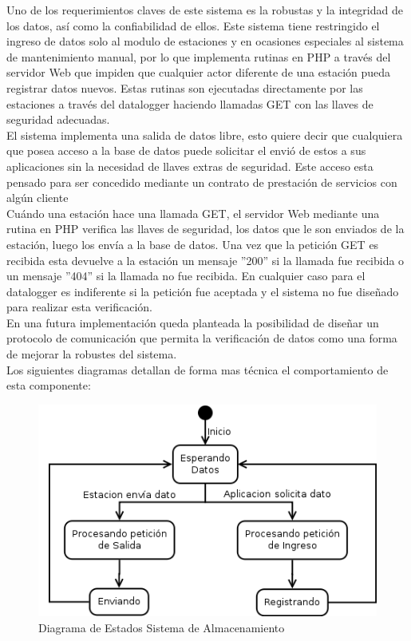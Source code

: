 Uno de los requerimientos claves de este sistema es la robustas y la integridad de los datos, así como la confiabilidad de ellos. Este sistema tiene restringido el ingreso de datos solo al modulo de estaciones y en ocasiones especiales al sistema de mantenimiento manual, por lo que implementa rutinas en PHP a través del servidor Web que impiden que cualquier actor diferente de una estación pueda registrar datos nuevos. Estas rutinas son ejecutadas directamente por las estaciones a través del datalogger haciendo llamadas GET con las llaves de seguridad adecuadas.\\
El sistema implementa una salida de datos libre, esto quiere decir que cualquiera que posea acceso a la base de datos puede solicitar el envió de estos a sus aplicaciones sin la necesidad de llaves extras de seguridad. Este acceso esta pensado para ser concedido mediante un contrato de prestación de servicios con algún cliente\\

Cuándo una estación hace una llamada GET, el servidor Web mediante una rutina en PHP verifica las llaves de seguridad, los datos que le son enviados de la estación, luego los envía a la base de datos. Una vez que la petición GET es recibida esta devuelve a la estación un mensaje ''200'' si la llamada fue recibida o un mensaje ''404'' si la llamada no fue recibida. En cualquier caso para el datalogger es indiferente si la petición fue aceptada y el sistema no fue diseñado para realizar esta verificación.\\ En una futura implementación queda planteada la posibilidad de diseñar un protocolo de comunicación que permita la verificación de datos como una forma de mejorar la robustes del sistema.\\
Los siguientes diagramas detallan de forma mas técnica el comportamiento de esta componente:
\begin{figure}[h!]
        \centering
        \includegraphics[scale=0.5]{images/datosEstados}
        \caption{Diagrama de Estados Sistema de Almacenamiento}
        \label{almacenamientoSecuencia}
\end{figure}

